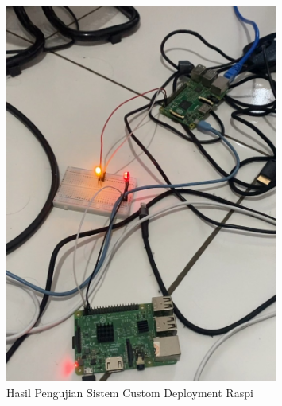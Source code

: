 \begin{figure}[ht]
  \centering
  \includegraphics[width=0.8\textwidth]{resources/chapter-4/pengujian/pengujian-sistem-raspi-hasil-b.jpg}
  \caption{Hasil Pengujian Sistem Custom Deployment Raspi}
  \label{fig:hasil-pengujian-sistem-raspi-custom}
\end{figure}




